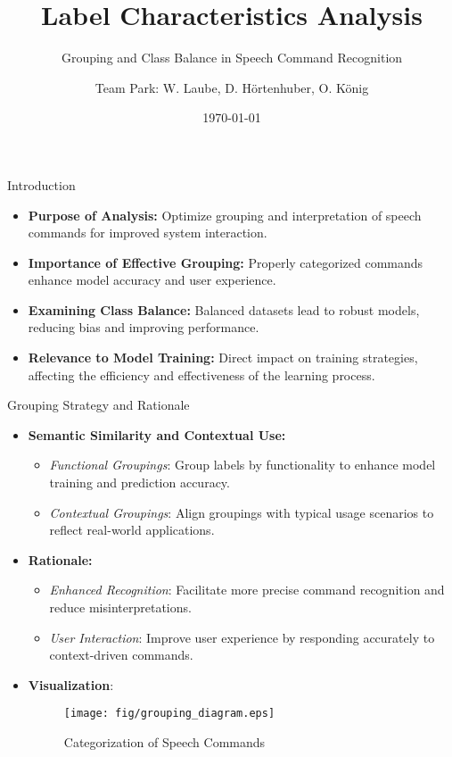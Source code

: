 \documentclass{beamer}
\title{Label Characteristics Analysis}
\subtitle{Grouping and Class Balance in Speech Command Recognition}
\author{Team Park: W. Laube, D. Hörtenhuber, O. König}
\institute{JKU \\ MLPC}
\date{\today}
\begin{document}
\begin{frame}
  \titlepage
\end{frame}

\begin{frame}{Introduction}
  \begin{itemize}
    \item \textbf{Purpose of Analysis:} Optimize grouping and interpretation of speech commands for improved system interaction.
    \item \textbf{Importance of Effective Grouping:} Properly categorized commands enhance model accuracy and user experience.
    \item \textbf{Examining Class Balance:} Balanced datasets lead to robust models, reducing bias and improving performance.
    \item \textbf{Relevance to Model Training:} Direct impact on training strategies, affecting the efficiency and effectiveness of the learning process.
  \end{itemize}
\end{frame}

\begin{frame}{Grouping Strategy and Rationale}
  \begin{itemize}
    \item \textbf{Semantic Similarity and Contextual Use:}
      \begin{itemize}
        \item \textit{Functional Groupings}: Group labels by functionality to enhance model training and prediction accuracy.
        \item \textit{Contextual Groupings}: Align groupings with typical usage scenarios to reflect real-world applications.
      \end{itemize}
    \item \textbf{Rationale:}
      \begin{itemize}
        \item \textit{Enhanced Recognition}: Facilitate more precise command recognition and reduce misinterpretations.
        \item \textit{User Interaction}: Improve user experience by responding accurately to context-driven commands.
      \end{itemize}
    \item \textbf{Visualization}:
      \begin{figure}
        \centering
        \texttt{[image: fig/grouping\_diagram.eps]} %
        \caption{Categorization of Speech Commands}
        \label{fig:grouping}
      \end{figure}
  \end{itemize}
\end{frame}
\end{document}
